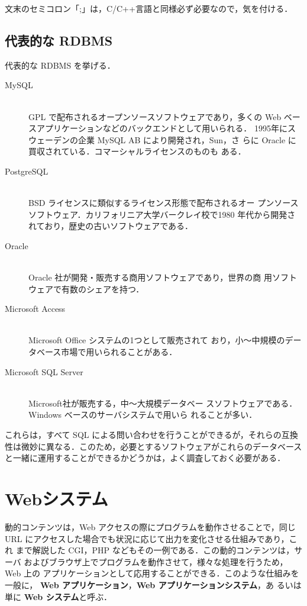 文末のセミコロン「;」は，C/C++言語と同様必ず必要なので，気を付ける．

\subsection{代表的な RDBMS}

代表的な RDBMS を挙げる．

\begin{description}
 \item[MySQL] \mbox{} \\
            GPL で配布されるオープンソースソフトウェアであり，多くの
	    Web ベースアプリケーションなどのバックエンドとして用いられる．
	    1995年にスウェーデンの企業 MySQL AB により開発され，Sun，さ
	    らに Oracle に買収されている．コマーシャルライセンスのものも
	    ある．
 \item[PostgreSQL] \mbox{} \\
            BSD ライセンスに類似するライセンス形態で配布されるオー
	    プンソースソフトウェア．カリフォリニア大学バークレイ校で1980
	    年代から開発されており，歴史の古いソフトウェアである．
 \item[Oracle] \mbox{} \\
            Oracle 社が開発・販売する商用ソフトウェアであり，世界の商
	    用ソフトウェアで有数のシェアを持つ．
 \item[Microsoft Access] \mbox{} \\
            Microsoft Office システムの1つとして販売されて
	    おり，小〜中規模のデータベース市場で用いられることがある．
 \item[Microsoft SQL Server] \mbox{} \\
            Microsoft社が販売する，中〜大規模データベー
	    スソフトウェアである．Windows ベースのサーバシステムで用いら
	    れることが多い．
\end{description}

これらは，すべて SQL による問い合わせを行うことができるが，それらの互換
性は微妙に異なる．このため，必要とするソフトウェアがこれらのデータベース
と一緒に運用することができるかどうかは，よく調査しておく必要がある．


\section{Webシステム}
動的コンテンツは，Web アクセスの際にプログラムを動作させることで，同じ
URL にアクセスした場合でも状況に応じて出力を変化させる仕組みであり，これ
まで解説した CGI，PHP などもその一例である．この動的コンテンツは，サーバ
およびブラウザ上でプログラムを動作させて，様々な処理を行うため，Web 上の
アプリケーションとして応用することができる．このような仕組みを一般に，
\textbf{Web アプリケーション}，\textbf{Web アプリケーションシステム}，あ
るいは単に \textbf{Web システム}と呼ぶ．

